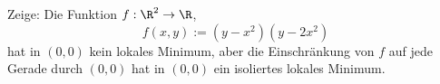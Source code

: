\begin{prob}
Zeige: Die Funktion $f:\R^2\to\R$, 
$$
   f(x,y) := (y-x^2)(y-2x^2)
$$
hat in $(0,0)$ kein lokales Minimum, aber die Einschr\"ankung von $f$
auf jede Gerade durch $(0,0)$ hat in $(0,0)$ ein isoliertes lokales
Minimum.   
\end{prob}
